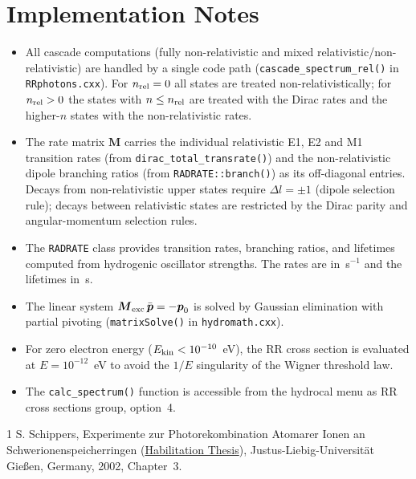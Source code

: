 \documentclass[11pt,a4paper]{article}
\newcommand{\bM}{\boldsymbol{M}}
\newcommand{\bp}{\boldsymbol{p}}
\begin{document}
\section{Implementation Notes}

\begin{itemize}
\item All cascade computations (fully non-relativistic and mixed
  relativistic/non-relativistic) are handled by a single code path
  (\texttt{cascade\_spectrum\_rel()} in \texttt{RRphotons.cxx}).  For
  $n_{\rm rel}=0$ all states are treated non-relativistically; for
  $n_{\rm rel}>0$ the states with $n \le n_{\rm rel}$ are treated with the
  Dirac rates and the higher-$n$ states with the non-relativistic rates.
\item The rate matrix $\bM$ carries the individual
  relativistic E1, E2 and M1 transition rates (from
  \texttt{dirac\_total\_transrate()}) and the non-relativistic dipole
  branching ratios (from \texttt{RADRATE::branch()}) as its off-diagonal
  entries.  Decays from non-relativistic upper states require
  $\Delta l = \pm 1$ (dipole selection rule); decays between relativistic
  states are restricted by the Dirac parity and angular-momentum
  selection rules.
\item The \texttt{RADRATE} class provides transition rates, branching
  ratios, and lifetimes computed from hydrogenic oscillator strengths.
  The rates are in~s$^{-1}$ and the lifetimes in~s.
\item The linear system $\bM_{\rm exc}\, \bar{\bp} = -\bp_0$ is solved
  by Gaussian elimination with partial pivoting
  (\texttt{matrixSolve()} in \texttt{hydromath.cxx}).
\item For zero electron energy ($E_{\rm kin} < 10^{-10}$~eV), the RR
  cross section is evaluated at $E = 10^{-12}$~eV to avoid the $1/E$
  singularity of the Wigner threshold law.
\item The \texttt{calc\_spectrum()} function is accessible from the
  hydrocal menu as RR cross sections group, option~4.
\end{itemize}

\begin{thebibliography}{1}
   S. Schippers, Experimente zur Photorekombination Atomarer Ionen an Schwerionenspeicherringen (\href{https://doi.org/10.22029/jlupub-15034}{Habilitation Thesis}), Justus-Liebig-Universit\"at Gie{\ss}en, Germany, 2002, Chapter~3.
\end{thebibliography}
\end{document}
